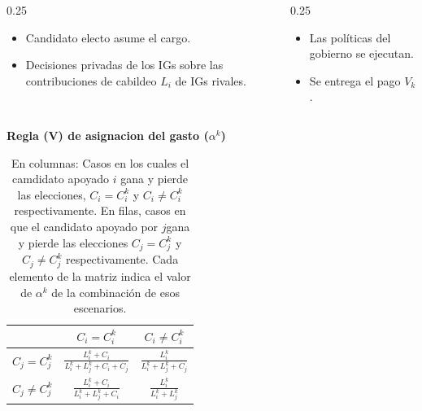 \documentclass[
  ignorenonframetext,
]{beamer}
\begin{document}
\begin{frame}{}
\begin{columns}
    \begin{column}{0.25\textwidth}
        \begin{itemize}
            \item Candidato electo asume el cargo.
            \item Decisiones privadas de los IGs sobre las contribuciones de cabildeo $L_i$ de IGs rivales.
        \end{itemize}
    \end{column}

    \begin{column}{0.25\textwidth}
        \begin{itemize}
            \item Las políticas del gobierno se ejecutan.
            \item Se entrega el pago $V_k$.
        \end{itemize}
    \end{column}
\end{columns}
\end{frame}

\begin{frame}{}
\label{section-2}
\begin{table}[ht]
\begin{center}
\textbf{Regla (V) de asignacion del gasto  ($\alpha^k$)} \\
\vspace{3 mm}
\begin{tabular}[t]{l |c |c}
     &   $C_i = C^k_i$   &    $C_i \neq C^k_i$   \\
\hline
$C_j = C^k_j$ &   $\frac{L^k_i + C_i}{L^k_i + L^k_j + C_i + C_j}$  & $\frac{L^k_i }{L^k_i + L^k_j + C_j}$ \\
\hline
$C_j \neq C^k_j$ &   $\frac{L^k_i + C_i}{L^k_i + L^k_j + C_i}$  & $\frac{L^k_i }{L^k_i + L^k_j}$ \\
\end{tabular}
\caption{\scriptsize En columnas: Casos en los cuales el camdidato apoyado $i$ gana y pierde las elecciones, $C_i = C^k_i$ y $C_i \neq C^k_i$ respectivamente.  En filas, casos en que el candidato apoyado por $j$gana y pierde las elecciones $C_j = C^k_j$ y $C_j \neq C^k_j$ respectivamente. Cada elemento de la matriz indica el valor de $\alpha^k$ de la combinación de esos escenarios.}
\end{center}
\end{table}
\end{frame}
\end{document}

